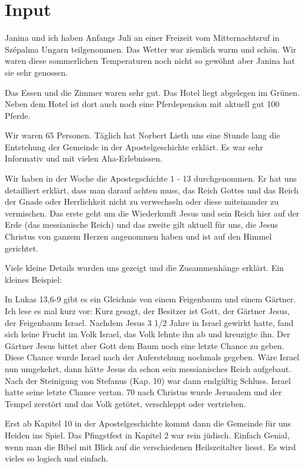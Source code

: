 \documentclass[12pt,a4paper]{scrarticle}
\begin{document}
\section{ Input }
\begin{spacing}{1.5}
Janina und ich haben Anfangs Juli an einer Freizeit vom Mitternachtsruf in Szépalma Ungarn teilgenommen. Das Wetter war ziemlich warm und schön. Wir waren diese sommerlichen Temperaturen noch nicht so gewöhnt aber Janina hat sie sehr genossen.

Das Essen und die Zimmer waren sehr gut. Das Hotel liegt abgelegen im Grünen. Neben dem Hotel ist dort auch noch eine Pferdepension mit aktuell gut 100 Pferde.

Wir waren 65 Personen. Täglich hat Norbert Lieth uns eine Stunde lang die Entstehung der Gemeinde in der Apostelgeschichte erklärt. Es war sehr Informativ und mit vielen Aha-Erlebnissen.

Wir haben in der Woche die Apostegschichte 1 - 13 durchgenommen. Er hat uns detailliert erklärt, dass man darauf achten muss, das Reich Gottes und das Reich der Gnade oder Herrlichkeit nicht zu verwechseln oder diese miteinander zu vermischen. Das erste geht um die Wiederkunft Jesus und sein Reich hier auf der Erde (das messianische Reich) und das zweite gilt aktuell für uns, die Jesus Christus von ganzem Herzen angenommen haben und ist auf den Himmel gerichtet.

Viele kleine Details wurden uns gezeigt und die Zusammenhänge erklärt. Ein kleines Beispiel:

In Lukas 13,6-9 gibt es ein Gleichnis von einem Feigenbaum und einem Gärtner. Ich lese es mal kurz vor:
Kurz gesagt, der Besitzer ist Gott, der Gärtner Jesus, der Feigenbaum Israel. Nachdem Jesus 3 1/2 Jahre in Israel gewirkt hatte, fand sich keine Frucht im Volk Israel, das Volk lehnte ihn ab und kreuzigte ihn. Der Gärtner Jesus bittet aber Gott dem Baum noch eine letzte Chance zu geben. Diese Chance wurde Israel nach der Auferstehung nochmals gegeben. Wäre Israel nun umgekehrt, dann hätte Jesus da schon sein messianisches Reich aufgebaut. Nach der Steinigung von Stefanus (Kap. 10) war dann endgültig Schluss. Israel hatte seine letzte Chance vertan. 70 nach Christus wurde Jerusalem und der Tempel zerstört und das Volk getötet, verschleppt oder vertrieben.

Erst ab Kapitel 10 in der Apostelgeschichte kommt dann die Gemeinde für uns Heiden ins Spiel. Das Pfingstfest in Kapitel 2 war rein jüdisch. Einfach Genial, wenn man die Bibel mit Blick auf die verschiedenen Heilszeitalter liesst. Es wird vieles so logisch und einfach.


\end{spacing}
\end{document}
